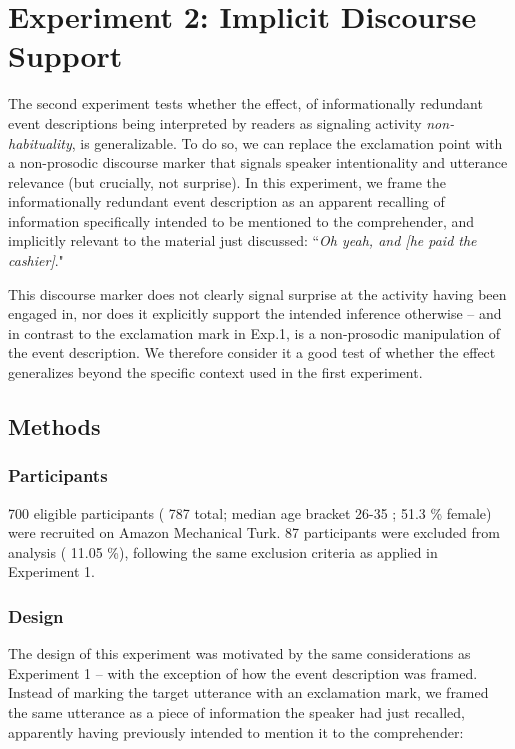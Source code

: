 \documentclass{sp}\usepackage[]{graphicx}\usepackage[]{color}
\begin{document}
\section{Experiment 2: Implicit Discourse Support}\label{exp2}



The second experiment tests whether the effect, of informationally redundant event descriptions being interpreted by readers as signaling activity \textit{non-habituality}, is generalizable. To do so, we can replace the exclamation point with a non-prosodic discourse marker that signals speaker intentionality and utterance relevance (but crucially, not surprise). In this experiment, we frame the informationally redundant event description as an apparent recalling of information specifically intended to be mentioned to the comprehender, and implicitly relevant to the material just discussed: ``\textit{Oh yeah, and [he paid the cashier]}."

This discourse marker does not clearly signal surprise at the activity having been engaged in, nor does it explicitly support the intended inference otherwise -- and in contrast to the exclamation mark in Exp.1, is a non-prosodic manipulation of the event description. We therefore consider it a good test of whether the effect generalizes beyond the specific context used in the first experiment.

\subsection{Methods}

\subsubsection{Participants}

700 eligible participants (%
787
 total; median age bracket %
26-35
; %
51.3
\% female) were recruited on Amazon Mechanical Turk. %
87
 participants were excluded from analysis (%
11.05
\%), following the same exclusion criteria as applied in Experiment 1.

\subsubsection{Design}

The design of this experiment was motivated by the same considerations as Experiment 1 -- with the exception of how the event description was framed. Instead of marking the target utterance with an exclamation mark, we framed the same utterance as a piece of information the speaker had just recalled, apparently having previously intended to mention it to the comprehender:
\end{document}
